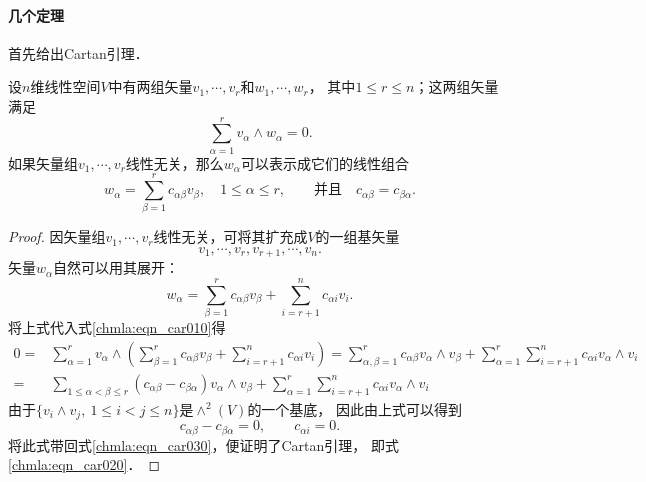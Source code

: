\paragraph{几个定理}

首先给出Cartan引理． 


\begin{theorem}\label{chmla:thm_cartanlemma}
设$n$维线性空间$V$中有两组矢量$v_1,\cdots,v_r$和$w_1,\cdots,w_r$，
其中$1 \leqslant r \leqslant n$；这两组矢量满足
\begin{equation} \label{chmla:eqn_car010}
    \sum_{\alpha=1}^{r} v_\alpha \wedge w_\alpha = 0.
\end{equation}
如果矢量组$v_1,\cdots,v_r$线性无关，那么$w_\alpha$可以表示成它们的线性组合
\begin{equation}\label{chmla:eqn_car020}
    w_\alpha = \sum_{\beta=1}^{r} c_{\alpha\beta} v_\beta, \quad
    1 \leqslant \alpha \leqslant r, \qquad
    {\text{并且}}\quad c_{\alpha\beta} = c_{\beta\alpha}  .
\end{equation}
\end{theorem}

\begin{proof}
因矢量组$v_1,\cdots,v_r$线性无关，可将其扩充成$V$的一组基矢量
\begin{equation*}
    v_1,\cdots,v_r, v_{r+1},\cdots,v_n .
\end{equation*}
矢量$w_\alpha$自然可以用其展开：
\begin{equation}\label{chmla:eqn_car030}
    w_\alpha = \sum_{\beta=1}^{r} c_{\alpha\beta} v_\beta
       + \sum_{i=r+1}^{n} c_{\alpha i} v_i .
\end{equation}
将上式代入式\eqref{chmla:eqn_car010}得
\begin{align*}
    0=& \sum_{\alpha=1}^{r} v_\alpha \wedge
      \left(\sum_{\beta=1}^{r} c_{\alpha\beta} v_\beta
      + \sum_{i=r+1}^{n} c_{\alpha i} v_i\right)
    = \sum_{\alpha,\beta=1}^{r} c_{\alpha\beta} v_\alpha \wedge v_\beta
      + \sum_{\alpha=1}^{r} \sum_{i=r+1}^{n} c_{\alpha i} v_\alpha \wedge  v_i \\
    =& \sum_{1\leqslant \alpha<\beta \leqslant r}^{} (c_{\alpha\beta}-c_{\beta\alpha} )
        v_\alpha \wedge v_\beta
    + \sum_{\alpha=1}^{r} \sum_{i=r+1}^{n} c_{\alpha i} v_\alpha \wedge  v_i
\end{align*}
由于$\{v_i \wedge v_j, \ 1\leqslant i<j \leqslant n\}$是$\wedge^2(V)$的一个基底，
因此由上式可以得到
\begin{equation}
    c_{\alpha\beta}-c_{\beta\alpha}=0, \qquad c_{\alpha i} =0.
\end{equation}
将此式带回式\eqref{chmla:eqn_car030}，便证明了Cartan引理，
即式\eqref{chmla:eqn_car020}．
\end{proof}


